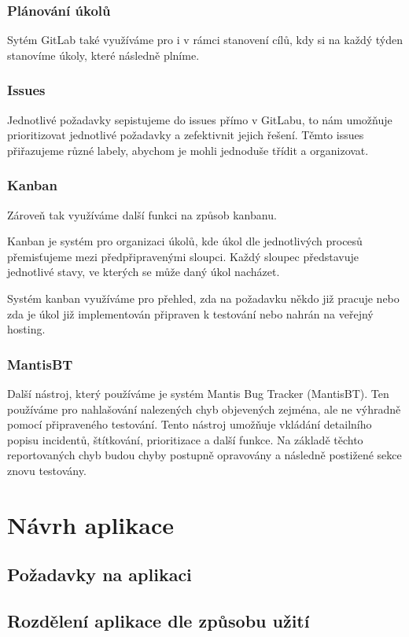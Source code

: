 \documentclass[czech,BP]{thesiskiv}
\begin{document}
\subsubsection{Plánování úkolů}
\par Sytém GitLab také využíváme pro i v rámci stanovení cílů, kdy si na každý týden stanovíme úkoly, které následně plníme.
\subsubsection{Issues}
\par Jednotlivé požadavky sepistujeme do issues přímo v GitLabu, to nám umožňuje prioritizovat jednotlivé požadavky a zefektivnit jejich řešení. Těmto issues přiřazujeme různé labely, abychom je mohli jednoduše třídit a organizovat.
\subsubsection{Kanban}
\par Zároveň tak využíváme další funkci na způsob kanbanu.
\par Kanban je systém pro organizaci úkolů, kde úkol dle jednotlivých procesů přemisťujeme mezi předpřipravenými sloupci. Každý sloupec představuje jednotlivé stavy, ve kterých se může daný úkol nacházet.
\par Systém kanban využíváme pro přehled, zda na požadavku někdo již pracuje nebo zda je úkol již implementován připraven k testování nebo nahrán na veřejný hosting.
\subsubsection{MantisBT}
\par Další nástroj, který používáme je systém Mantis Bug Tracker (MantisBT). Ten používáme pro nahlašování nalezených chyb objevených zejména, ale ne výhradně pomocí připraveného testování. Tento nástroj umožňuje vkládání detailního popisu incidentů, štítkování, prioritizace a další funkce. Na základě těchto reportovaných chyb budou chyby postupně opravovány a následně postižené sekce znovu testovány.
\section{Návrh aplikace} 
	\subsection{Požadavky na aplikaci}
	\subsection{Rozdělení aplikace dle způsobu užití}
\end{document}
